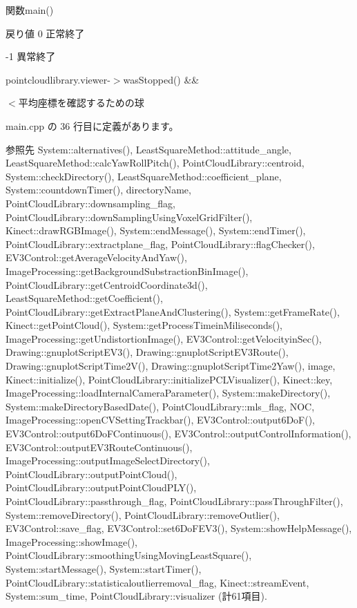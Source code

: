 関数main() 

\begin{DoxyReturn}{戻り値}
0 正常終了 

-\/1 異常終了 
\end{DoxyReturn}
pointcloudlibrary.\-viewer-\/$>$was\-Stopped() \&\&

$<$平均座標を確認するための球 

 main.\-cpp の 36 行目に定義があります。



参照先 System\-::alternatives(), Least\-Square\-Method\-::attitude\-\_\-angle, Least\-Square\-Method\-::calc\-Yaw\-Roll\-Pitch(), Point\-Cloud\-Library\-::centroid, System\-::check\-Directory(), Least\-Square\-Method\-::coefficient\-\_\-plane, System\-::countdown\-Timer(), directory\-Name, Point\-Cloud\-Library\-::downsampling\-\_\-flag, Point\-Cloud\-Library\-::down\-Sampling\-Using\-Voxel\-Grid\-Filter(), Kinect\-::draw\-R\-G\-B\-Image(), System\-::end\-Message(), System\-::end\-Timer(), Point\-Cloud\-Library\-::extractplane\-\_\-flag, Point\-Cloud\-Library\-::flag\-Checker(), E\-V3\-Control\-::get\-Average\-Velocity\-And\-Yaw(), Image\-Processing\-::get\-Background\-Substraction\-Bin\-Image(), Point\-Cloud\-Library\-::get\-Centroid\-Coordinate3d(), Least\-Square\-Method\-::get\-Coefficient(), Point\-Cloud\-Library\-::get\-Extract\-Plane\-And\-Clustering(), System\-::get\-Frame\-Rate(), Kinect\-::get\-Point\-Cloud(), System\-::get\-Process\-Timein\-Miliseconds(), Image\-Processing\-::get\-Undistortion\-Image(), E\-V3\-Control\-::get\-Velocityin\-Sec(), Drawing\-::gnuplot\-Script\-E\-V3(), Drawing\-::gnuplot\-Script\-E\-V3\-Route(), Drawing\-::gnuplot\-Script\-Time2\-V(), Drawing\-::gnuplot\-Script\-Time2\-Yaw(), image, Kinect\-::initialize(), Point\-Cloud\-Library\-::initialize\-P\-C\-L\-Visualizer(), Kinect\-::key, Image\-Processing\-::load\-Internal\-Camera\-Parameter(), System\-::make\-Directory(), System\-::make\-Directory\-Based\-Date(), Point\-Cloud\-Library\-::mls\-\_\-flag, N\-O\-C, Image\-Processing\-::open\-C\-V\-Setting\-Trackbar(), E\-V3\-Control\-::output6\-Do\-F(), E\-V3\-Control\-::output6\-Do\-F\-Continuous(), E\-V3\-Control\-::output\-Control\-Information(), E\-V3\-Control\-::output\-E\-V3\-Route\-Continuous(), Image\-Processing\-::output\-Image\-Select\-Directory(), Point\-Cloud\-Library\-::output\-Point\-Cloud(), Point\-Cloud\-Library\-::output\-Point\-Cloud\-P\-L\-Y(), Point\-Cloud\-Library\-::passthrough\-\_\-flag, Point\-Cloud\-Library\-::pass\-Through\-Filter(), System\-::remove\-Directory(), Point\-Cloud\-Library\-::remove\-Outlier(), E\-V3\-Control\-::save\-\_\-flag, E\-V3\-Control\-::set6\-Do\-F\-E\-V3(), System\-::show\-Help\-Message(), Image\-Processing\-::show\-Image(), Point\-Cloud\-Library\-::smoothing\-Using\-Moving\-Least\-Square(), System\-::start\-Message(), System\-::start\-Timer(), Point\-Cloud\-Library\-::statisticaloutlierremoval\-\_\-flag, Kinect\-::stream\-Event, System\-::sum\-\_\-time, Point\-Cloud\-Library\-::visualizer (計61項目).



